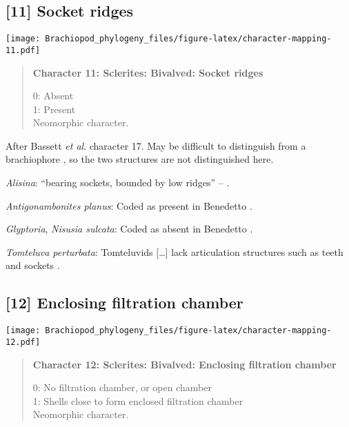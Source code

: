 \documentclass[openany]{book}
\theoremstyle{definition}
\theoremstyle{definition}
\theoremstyle{definition}
\theoremstyle{remark}
\begin{document}
\subsection*{{[}11{]} Socket ridges}\label{socket-ridges}

\texttt{[image: Brachiopod\_phylogeny\_files/figure-latex/character-mapping-11.pdf]}

\begin{quote}
\textbf{Character 11: Sclerites: Bivalved: Socket ridges}

0: Absent\\
1: Present\\
Neomorphic character.
\end{quote}

After Bassett \emph{et al}.
\citeyearpar{Bassett2001Functionalmorphology} character 17. May be
difficult to distinguish from a brachiophore \citep[see Fig 323
in][]{Williams1997Introduction}, so the two structures are not
distinguished here.

\hypertarget{Alisina-coding-11}{}
\emph{Alisina}: ``bearing sockets, bounded by low ridges'' --
\citet{Williams2000LinguliformeaCraniiformea}.

\hypertarget{Antigonambonites_planus-coding-11}{}
\emph{Antigonambonites planus}: Coded as present in Benedetto
\citeyearpar{Benedetto2009iChaniella}.

\hypertarget{Glyptoria-coding-11}{}
\emph{Glyptoria}, \emph{Nisusia sulcata}: Coded as absent in Benedetto
\citeyearpar{Benedetto2009iChaniella}.

\hypertarget{Tomteluva_perturbata-coding-11}{}
\emph{Tomteluva perturbata}: Tomteluvids {[}\ldots{}{]} lack
articulation structures such as teeth and sockets
\citep{Streng2016Anew}.

\subsection*{{[}12{]} Enclosing filtration
chamber}\label{enclosing-filtration-chamber}

\texttt{[image: Brachiopod\_phylogeny\_files/figure-latex/character-mapping-12.pdf]}

\begin{quote}
\textbf{Character 12: Sclerites: Bivalved: Enclosing filtration chamber}

0: No filtration chamber, or open chamber\\
1: Shells close to form enclosed filtration chamber\\
Neomorphic character.
\end{quote}
\end{document}
